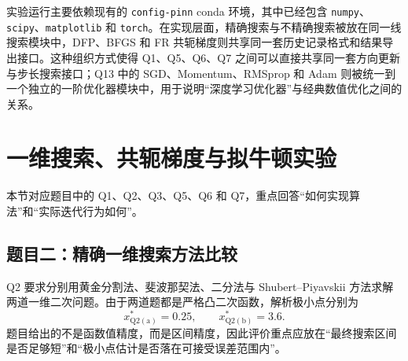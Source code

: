 \documentclass[UTF8,a4paper,12pt,fontset=none]{ctexart}
\begin{document}
\begin{table}[H]
\centering
\scriptsize
{}
\end{table}

实验运行主要依赖现有的 \texttt{config-pinn} conda 环境，其中已经包含 \texttt{numpy}、\texttt{scipy}、\texttt{matplotlib} 和 \texttt{torch}。在实现层面，精确搜索与不精确搜索被放在同一线搜索模块中，DFP、BFGS 和 FR 共轭梯度则共享同一套历史记录格式和结果导出接口。这种组织方式使得 Q1、Q5、Q6、Q7 之间可以直接共享同一套方向更新与步长搜索接口；Q13 中的 SGD、Momentum、RMSprop 和 Adam 则被统一到一个独立的一阶优化器模块中，用于说明“深度学习优化器”与经典数值优化之间的关系。

\section{一维搜索、共轭梯度与拟牛顿实验}

本节对应题目中的 Q1、Q2、Q3、Q5、Q6 和 Q7，重点回答“如何实现算法”和“实际迭代行为如何”。

\subsection{题目二：精确一维搜索方法比较}

Q2 要求分别用黄金分割法、斐波那契法、二分法与 Shubert--Piyavskii 方法求解两道一维二次问题。由于两道题都是严格凸二次函数，解析极小点分别为
\[
x_{\mathrm{Q2(a)}}^*=0.25,\qquad x_{\mathrm{Q2(b)}}^*=3.6.
\]
题目给出的不是函数值精度，而是区间精度，因此评价重点应放在“最终搜索区间是否足够短”和“极小点估计是否落在可接受误差范围内”。
\end{document}
